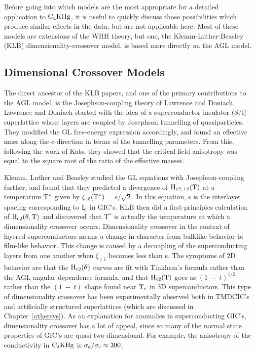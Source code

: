         Before going into  which models  are   the most appropriate   for a
detailed application to $\rm C_4KHg$, it is useful to quickly discuss those
possibilities  which produce similar effects   in  the  data, but  are  not
applicable here.  Most of these  models are  extensions  of the WHH theory,
but one, the Klemm-Luther-Beasley  (KLB) dimensionality-crossover model, is
based more directly on the AGL model.

\subsection{Dimensional Crossover Models}
\label{2d3d}

        The direct ancestor   of the KLB  papers,  and one  of the  primary
contributions to  the AGL  model,   is   the Josephson-coupling  theory  of
Lawrence and Doniach\cite{lawrence71}.   Lawrence and Doniach  started with
the idea of  a superconductor-insulator (S/I)  superlattice whose layers are
coupled by Josephson tunnelling  of quasiparticles.  They modified  the  GL
free-energy expression accordingly, and found  an effective mass along  the
c-direction in terms of  the tunnelling parameters.   From this,  following
the   work of  Kats\cite{kats69},  they  showed  that the  critical   field
anisotropy was   equal to the square  root  of the  ratio  of the effective
masses.

        Klemm,  Luther and Beasley\cite{klemm75}  studied  the GL equations
with Josephson-coupling further, and found that they predicted a divergence
of $\rm H_{c2, \perp \hat{c}}(T)$ at a temperature $\rm  T^*$ given by $\rm
\xi_{\parallel \hat{c}}(T^*)$ = s/$\sqrt{2}$.  In  this equation,  s is the
interlayer spacing corresponding  to $\rm I_c$  in GIC's.  KLB  then did  a
first-principles calculation of $\rm H_{c2}(\theta, T)$ and discovered that
T$^*$  is actually  the  temperature  at which  a  dimensionality crossover
occurs.  Dimensionality crossover in the context of layered superconductors
means a change in character  from  bulklike behavior to film-like behavior.
This change is  caused by  a decoupling of  the superconducting layers from
one  another when  $\xi_{\parallel\hat{c}}$   becomes  less  than   s.  The
symptoms  of 2D  behavior are that the  $\rm H_{c2}(\theta)$ curves are fit
with Tinkham's formula rather than the AGL  angular dependence formula, and
that $\rm H_{c2}(T)$ goes as $(1 \: - \: t)^{1/2}$ rather than the $(1
\: - \: t)$ shape found near $\rm T_c$ in 3D superconductors.  This type of
dimensionality  crossover   has  been   experimentally   observed  both  in
TMDCIC's\cite{prober80}   and  artificially structured superlattices (which
are   discussed   in    Chapter~\ref{othersys}).\cite{ruggiero82}  As    an
explanation  for anomalies    in   superconducting  GIC's,   dimensionality
crossover has a lot of appeal, since so many of the normal state properties
of  GIC's are  quasi-two-dimensional.  For  example,  the anisotropy of the
conductivity    in    $\rm    C_4KHg$   is   $\rm \sigma_a/\sigma_c  \approx
300$.\cite{fischer83}

